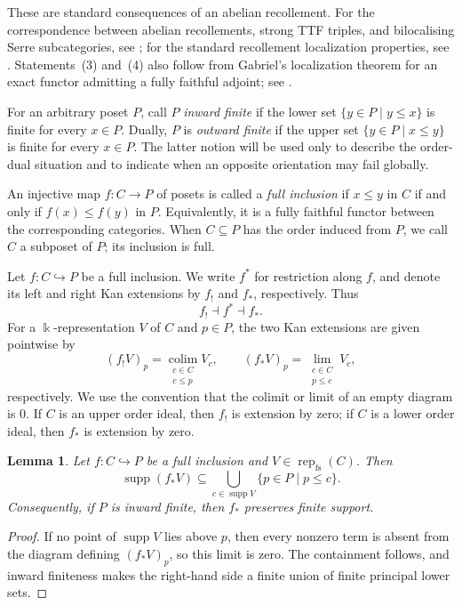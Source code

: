 \documentclass[10pt,a4paper]{amsart}
\newtheorem{lemma}[theorem]{Lemma}
\newcommand{\Rep}{\operatorname{rep}}
\begin{document}
These are standard consequences of an abelian recollement.  For the
correspondence between abelian recollements, strong TTF triples, and
bilocalising Serre subcategories, see \cite[Theorem~4.3]{PV}; for the standard
recollement localization properties, see \cite[Section~2]{Psaroudakis}.
Statements~(3) and~(4) also follow from Gabriel's localization theorem for
an exact functor admitting a fully faithful adjoint; see \cite{Gabriel}.

For an arbitrary poset $P$, call $P$ \emph{inward finite} if the lower set
$\{y\in P\mid y\le x\}$ is finite for every $x\in P$.  Dually, $P$ is
\emph{outward finite} if the upper set $\{y\in P\mid x\le y\}$ is finite for
every $x\in P$.  The latter notion will be used only to describe the
order-dual situation and to indicate when an opposite orientation may fail
globally.

An injective map $f:C\to P$ of posets is called a \emph{full inclusion} if
$x\le y$ in $C$ if and only if $f(x)\le f(y)$ in $P$.  Equivalently, it is a
fully faithful functor between the corresponding categories.  When
$C\subseteq P$ has the order induced from $P$, we call $C$ a subposet of $P$;
its inclusion is full.

Let $f:C\hookrightarrow P$ be a full inclusion.  We write $f^*$ for
restriction along $f$, and denote its left and right Kan extensions by
$f_!$ and $f_*$, respectively.  Thus
\[
f_!\dashv f^*\dashv f_*.
\]
For a $\Bbbk$-representation $V$ of $C$ and $p\in P$, the two Kan extensions are
given pointwise by
\[
(f_!V)_p=\operatorname*{colim}_{\substack{c\in C\\c\le p}}V_c,
\qquad
(f_*V)_p=\operatorname*{lim}_{\substack{c\in C\\p\le c}}V_c,
\]
respectively.  We use the convention that the colimit or limit of an empty
diagram is $0$.  If $C$ is an upper order ideal, then $f_!$ is extension by
zero; if $C$ is a lower order ideal, then $f_*$ is extension by zero.

\begin{lemma}\label{lem:fs-kan-support}
Let $f:C\hookrightarrow P$ be a full inclusion and
$V\in\Rep_{\mathrm{fs}}(C)$.  Then
\[
\operatorname{supp}(f_*V)
\subseteq\bigcup_{c\in\operatorname{supp}V}\{p\in P\mid p\le c\}.
\]
Consequently, if $P$ is inward finite, then $f_*$ preserves finite support.
\end{lemma}

\begin{proof}
If no point of $\operatorname{supp}V$ lies above $p$, then every nonzero term
is absent from the diagram defining $(f_*V)_p$, so this limit is zero.  The
containment follows, and inward finiteness makes the right-hand side a finite
union of finite principal lower sets.
\end{proof}
\end{document}
